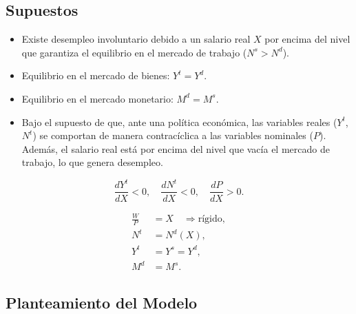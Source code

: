 \documentclass[
  doc,
  floatsintext,
  longtable,
  a4paper,
  nolmodern,
  notxfonts,
  notimes,
  colorlinks=true,linkcolor=blue,citecolor=blue,urlcolor=blue]{apa7}
\providecommand{\tightlist}{%
  \setlength{\itemsep}{0pt}\setlength{\parskip}{0pt}}
\begin{document}
\subsection{Supuestos}\label{supuestos-2}

\begin{itemize}
\tightlist
\item
  Existe desempleo involuntario debido a un salario real \(X\) por
  encima del nivel que garantiza el equilibrio en el mercado de trabajo
  (\(N^s > N^d\)).
\item
  Equilibrio en el mercado de bienes: \(Y^t = Y^d\).
\item
  Equilibrio en el mercado monetario: \(M^d = M^s\).
\item
  Bajo el supuesto de que, ante una política económica, las variables
  reales (\(Y^t\), \(N^t\)) se comportan de manera contracíclica a las
  variables nominales (\(P\)). Además, el salario real está por encima
  del nivel que vacía el mercado de trabajo, lo que genera desempleo.
\end{itemize}

\[
\frac{dY^t}{dX} < 0, \quad \frac{dN^t}{dX} < 0, \quad \frac{dP}{dX} > 0.
\]

\[
\begin{aligned}
\frac{W}{P} &= X \quad \Rightarrow \text{rígido}, \\
N^t &= N^d(X), \\
Y^t &= Y^s = Y^d, \\
M^d &= M^s.
\end{aligned}
\]

\subsection{Planteamiento del Modelo}\label{planteamiento-del-modelo}
\end{document}
